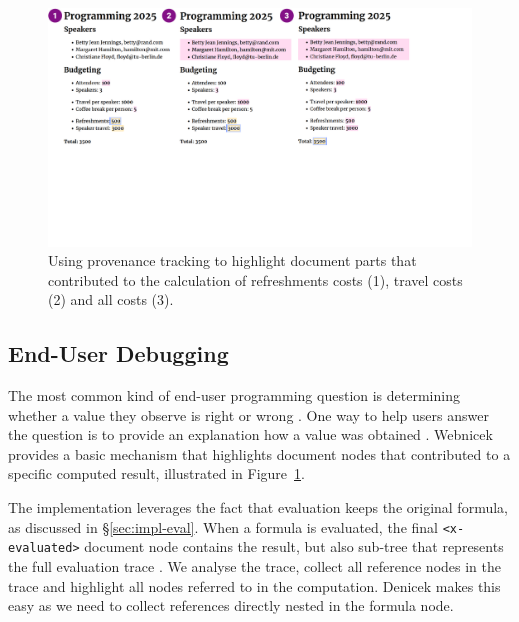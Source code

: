 \documentclass[sigconf,anonymous,screen]{acmart}
\begin{document}
\begin{figure}[t]
\vspace{-0.25em}
\includegraphics[width=1\columnwidth,clip,trim=0cm 8cm 5cm 0cm]{fig/provenance.pdf}
\vspace{-2em}
\caption{Using provenance tracking to highlight document parts that contributed to the
calculation of refreshments costs (1), travel costs (2) and all costs (3).}
\label{fig:provenance}
\vspace{-0.75em}
\end{figure}


\subsection{End-User Debugging}
\label{sec:impl-provenance}

The most common kind of end-user programming question is determining whether a value they observe
is right or wrong \cite{kissinger-2006-debugging}. One way to help users answer the question is
to provide an explanation how a value was obtained \cite{ko-2009-whyline}. Webnicek provides a basic
mechanism that highlights document nodes that contributed to a specific computed result,
illustrated in Figure~\ref{fig:provenance}.

The implementation leverages the fact that evaluation keeps the original formula, as discussed
in \S\ref{sec:impl-eval}. When a formula is evaluated, the final {\small\Verb_<x-evaluated>_}
document node contains the result, but also sub-tree that represents the full evaluation trace
\cite{perera-2012-functional}. We analyse the trace, collect all reference nodes in the trace and
highlight all nodes referred to in the computation. Denicek makes this easy as we
need to collect references directly nested in the formula node.
\end{document}
